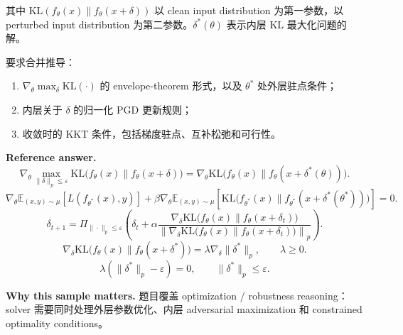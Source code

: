 \documentclass[11pt]{ctexart}
\newcommand{\why}[1]{\textbf{Why this sample matters.} #1}
\begin{document}
其中 $\mathrm{KL}(f_\theta(x)\|f_\theta(x+\delta))$ 以 clean input distribution 为第一参数，以 perturbed input distribution 为第二参数。$\delta^\ast(\theta)$ 表示内层 KL 最大化问题的解。

要求合并推导：
\begin{enumerate}
  \item $\nabla_\theta\max_\delta\mathrm{KL}(\cdot)$ 的 envelope-theorem 形式，以及 $\theta^\ast$ 处外层驻点条件；
  \item 内层关于 $\delta$ 的归一化 PGD 更新规则；
  \item 收敛时的 KKT 条件，包括梯度驻点、互补松弛和可行性。
\end{enumerate}

\textbf{Reference answer.}
\[
\nabla_\theta
\max_{\|\delta\|_p\leq\varepsilon}
\mathrm{KL}\bigl(f_\theta(x)\|f_\theta(x+\delta)\bigr)
=
\nabla_\theta
\mathrm{KL}\bigl(f_\theta(x)\|f_\theta(x+\delta^\ast(\theta))\bigr).
\]
\[
\nabla_\theta\mathbb{E}_{(x,y)\sim\mu}
\left[L(f_{\theta^\ast}(x),y)\right]
+
\beta\nabla_\theta\mathbb{E}_{(x,y)\sim\mu}
\left[
\mathrm{KL}\bigl(f_{\theta^\ast}(x)\|f_{\theta^\ast}(x+\delta^\ast(\theta^\ast))\bigr)
\right]
=0.
\]
\[
\delta_{t+1}
=
\Pi_{\|\cdot\|_p\leq\varepsilon}
\left(
\delta_t+
\alpha
\frac{
\nabla_\delta\mathrm{KL}\bigl(f_\theta(x)\|f_\theta(x+\delta_t)\bigr)
}{
\left\|
\nabla_\delta\mathrm{KL}\bigl(f_\theta(x)\|f_\theta(x+\delta_t)\bigr)
\right\|_p
}
\right).
\]
\[
\nabla_\delta\mathrm{KL}\bigl(f_\theta(x)\|f_\theta(x+\delta^\ast)\bigr)
=
\lambda\nabla_\delta\|\delta^\ast\|_p,\qquad
\lambda\geq0.
\]
\[
\lambda(\|\delta^\ast\|_p-\varepsilon)=0,\qquad
\|\delta^\ast\|_p\leq\varepsilon.
\]

\why{题目覆盖 optimization / robustness reasoning：solver 需要同时处理外层参数优化、内层 adversarial maximization 和 constrained optimality conditions。}
\end{document}
